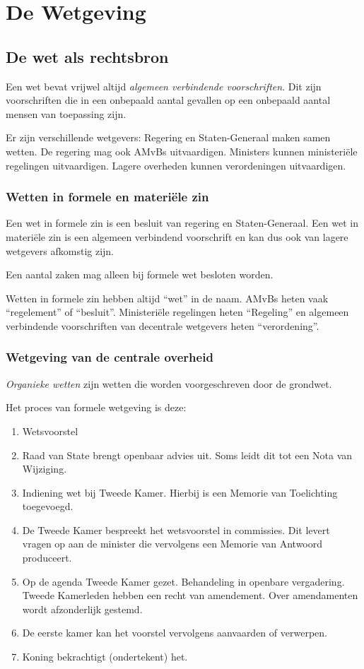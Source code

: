 \documentclass{article}
\begin{document}
\section{De Wetgeving}

\subsection{De wet als rechtsbron}

Een wet bevat vrijwel altijd \emph{algemeen verbindende voorschriften}. Dit
zijn voorschriften die in een onbepaald aantal gevallen op een onbepaald aantal
mensen van toepassing zijn. 

Er zijn verschillende wetgevers: Regering en Staten-Generaal maken samen
wetten. De regering mag ook AMvBs uitvaardigen. Ministers kunnen ministeri\"ele
regelingen uitvaardigen. Lagere overheden kunnen verordeningen uitvaardigen. 

\subsubsection{Wetten in formele en materi\"ele zin}

Een wet in formele zin is een besluit van regering en Staten-Generaal. Een wet
in materi\"ele zin is een algemeen verbindend voorschrift en kan dus ook van
lagere wetgevers afkomstig zijn.

Een aantal zaken mag alleen bij formele wet besloten worden. 

Wetten in formele zin hebben altijd ``wet'' in de naam. AMvBs heten vaak
``regelement'' of ``besluit''. Ministeri\"ele regelingen heten ``Regeling'' en
algemeen verbindende voorschriften van decentrale wetgevers heten
``verordening''. 

\subsubsection{Wetgeving van de centrale overheid}

\emph{Organieke wetten} zijn wetten die worden voorgeschreven door de grondwet. 

Het proces van formele wetgeving is deze:

\begin{enumerate}
  \item Wetsvoorstel
  \item Raad van State brengt openbaar advies uit. Soms leidt dit tot een Nota van Wijziging.
  \item Indiening wet bij Tweede Kamer. Hierbij is een Memorie van Toelichting toegevoegd.
  \item De Tweede Kamer bespreekt het wetsvoorstel in commissies. Dit levert vragen op aan de minister
    die vervolgens een Memorie van Antwoord produceert.
  \item Op de agenda Tweede Kamer gezet. Behandeling in openbare vergadering. Tweede Kamerleden hebben 
    een recht van amendement. Over amendamenten wordt afzonderlijk gestemd. 
  \item De eerste kamer kan het voorstel vervolgens aanvaarden of verwerpen.
  \item Koning bekrachtigt (ondertekent) het. 
\end{enumerate}
\end{document}

